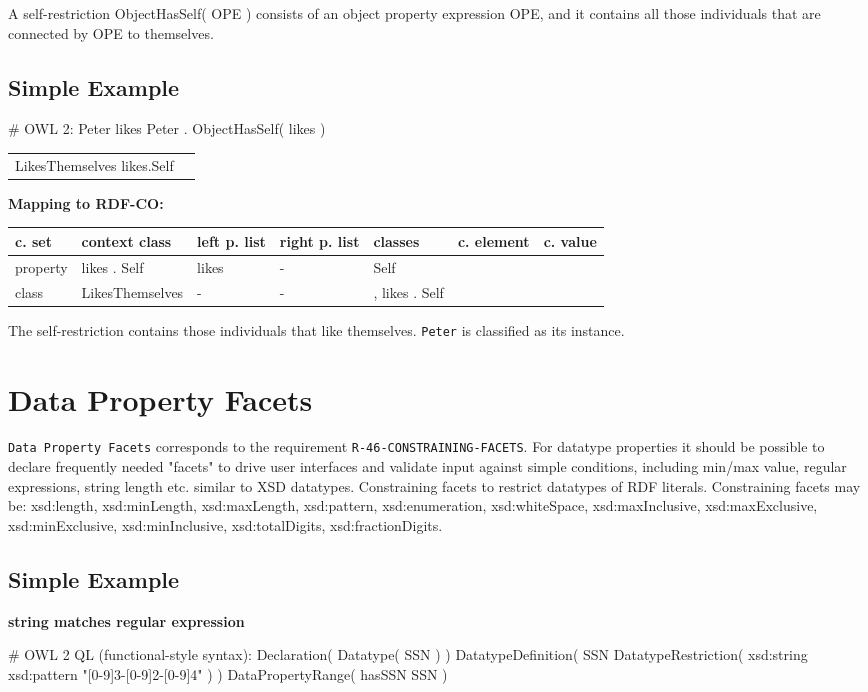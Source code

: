 \documentclass{llncs}
\newcommand{\ms}[1]{\texttt{#1}}
\newenvironment{gcotable}{
  \scriptsize
  \sffamily
  \vspace{0cm}
	\begin{center}
	\textbf{\vspace{0.4cm}Mapping to RDF-CO:} \\
  \begin{tabular}{l|l|l|l|l|l|l}
	\hline
  \textbf{c. set} & \textbf{context class} & \textbf{left p. list} & \textbf{right p. list} & \textbf{classes} & \textbf{c. element} & \textbf{c. value} \\
  \hline

}{
  \hline
  \end{tabular}
	\end{center}
}
\newenvironment{DL}{
\vspace{0cm}
	\begin{center}
  \begin{tabular}{r l}

}{
  \end{tabular}
	\end{center}
}
\begin{document}
A self-restriction ObjectHasSelf( OPE ) consists of an object property expression OPE, and it contains all those individuals that are connected by OPE to themselves. 

\subsection{Simple Example}

\begin{ex}
# OWL 2:
Peter likes Peter . 
ObjectHasSelf( likes ) 
\end{ex}

\begin{DL}
LikesThemselves   likes.Self
\end{DL}

\begin{gcotable}
property &  likes . Self & likes & - & Self &  \\
class & LikesThemselves & - & - & ,  likes . Self &  \\
\end{gcotable}

The self-restriction contains those individuals that like themselves.
\ms{Peter} is classified as its instance.

\section{Data Property Facets}

\ms{Data Property Facets} corresponds to the requirement
\ms{R-46-CONSTRAINING-FACETS}.
For datatype properties it should be possible to declare frequently needed "facets" to drive user interfaces and validate input against simple conditions, including min/max value, regular expressions, string length etc. similar to XSD datatypes. 
Constraining facets to restrict datatypes of RDF literals.
Constraining facets may be: xsd:length, xsd:minLength, xsd:maxLength, xsd:pattern, xsd:enumeration, xsd:whiteSpace, xsd:maxInclusive, xsd:maxExclusive, xsd:minExclusive, xsd:minInclusive, xsd:totalDigits, xsd:fractionDigits.

\subsection{Simple Example}

\textbf{string matches regular expression}

\begin{ex}
# OWL 2 QL (functional-style syntax):
Declaration( Datatype( SSN ) ) 
DatatypeDefinition( 
    SSN
    DatatypeRestriction( xsd:string xsd:pattern "[0-9]{3}-[0-9]{2}-[0-9]{4}" ) )     
DataPropertyRange( hasSSN SSN ) 
\end{ex}
\end{document}
